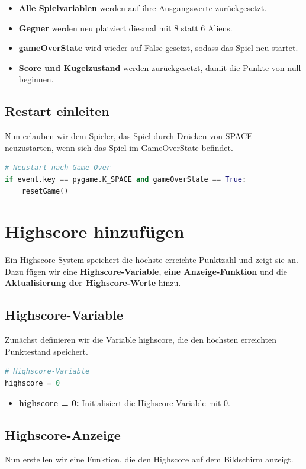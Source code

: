 \documentclass[a4paper,12pt]{article}
\begin{document}
\begin{itemize}
\item \textbf{Alle Spielvariablen} werden auf ihre Ausgangswerte zurückgesetzt.  
\item \textbf{Gegner} werden neu platziert diesmal mit 8 statt 6 Aliens.  
\item \textbf{gameOverState} wird wieder auf False gesetzt, sodass das Spiel neu startet.  
\item \textbf{Score und Kugelzustand} werden zurückgesetzt, damit die Punkte von null beginnen.
\end{itemize}


\subsection{Restart einleiten}
Nun erlauben wir dem Spieler, das Spiel durch Drücken von SPACE neuzustarten, wenn sich das Spiel im GameOverState befindet.

\begin{lstlisting}[style=pythonstyle, language=Python]
# Neustart nach Game Over
if event.key == pygame.K_SPACE and gameOverState == True: 
    resetGame()
\end{lstlisting}

\section{Highscore hinzufügen}
Ein Highscore-System speichert die höchste erreichte Punktzahl und zeigt sie an.  
Dazu fügen wir eine \textbf{Highscore-Variable}, \textbf{eine Anzeige-Funktion} und die \textbf{Aktualisierung der Highscore-Werte} hinzu.

\subsection{Highscore-Variable}
Zunächst definieren wir die Variable highscore, die den höchsten erreichten Punktestand speichert.

\begin{lstlisting}[style=pythonstyle, language=Python]
# Highscore-Variable
highscore = 0
\end{lstlisting}

\begin{itemize}
\item \textbf{highscore = 0:} Initialisiert die Highscore-Variable mit 0.
\end{itemize}


\subsection{Highscore-Anzeige}
Nun erstellen wir eine Funktion, die den Highscore auf dem Bildschirm anzeigt.
\end{document}
